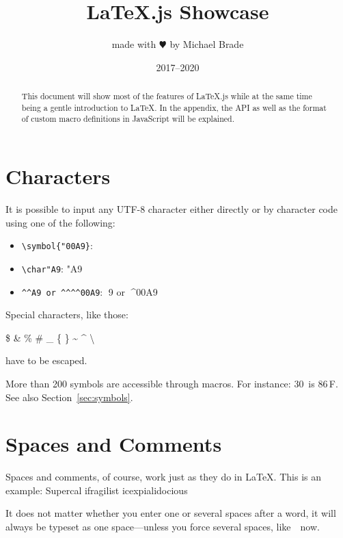 \documentclass{article}
\title{LaTeX.js Showcase}
\author{made with $\varheartsuit$ by Michael Brade}
\date{2017--2020}
\begin{document}
\maketitle


\begin{abstract}
This document will show most of the features of \LaTeX.js while at the same time being a gentle introduction to \LaTeX.
In the appendix, the API as well as the format of custom macro definitions in JavaScript will be explained.
\end{abstract}


\section{Characters}

It is possible to input any UTF-8 character either directly or by character code
using one of the following:

\begin{itemize}
    \item \texttt{\textbackslash symbol\{"00A9\}}: 
    \item \verb|\char"A9|: \char"A9
    \item \verb|^^A9 or ^^^^00A9|: ^^A9 or ^^^^00A9
\end{itemize}

\bigskip

\noindent
Special characters, like those:
\begin{center}
\$ \& \% \# \_ \{ \} \~{} \^{} \textbackslash %
\end{center}
%
have to be escaped.

More than 200 symbols are accessible through macros. For instance: 30\,\textcelsius{} is
86\,\textdegree{}F. See also Section~\ref{sec:symbols}.



\section{Spaces and Comments}

Spaces and comments, of course, work just as they do in \LaTeX.
This is an            %
example: Supercal%
                ifragilist%
    icexpialidocious

It does not matter whether you enter one or several     spaces after a word, it
will always be typeset as one space---unless you force several spaces, like\ \ now.
\end{document}
